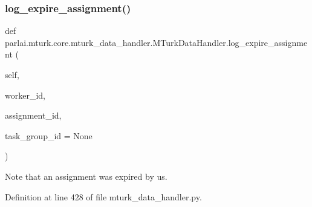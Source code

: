 \subsubsection{\texorpdfstring{log\+\_\+expire\+\_\+assignment()}{log\_expire\_assignment()}}
{\footnotesize\ttfamily def parlai.\+mturk.\+core.\+mturk\+\_\+data\+\_\+handler.\+M\+Turk\+Data\+Handler.\+log\+\_\+expire\+\_\+assignment (\begin{DoxyParamCaption}\item[{}]{self,  }\item[{}]{worker\+\_\+id,  }\item[{}]{assignment\+\_\+id,  }\item[{}]{task\+\_\+group\+\_\+id = {\ttfamily None} }\end{DoxyParamCaption})}

\begin{DoxyVerb}Note that an assignment was expired by us.
\end{DoxyVerb}
 

Definition at line 428 of file mturk\+\_\+data\+\_\+handler.\+py.


